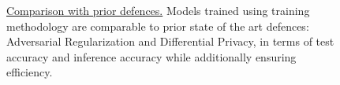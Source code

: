 \begin{figure}[ht!]
\begin{center}
{
}
\caption{\underline{Comparison with prior defences.} Models trained using \method\hspace{0.02in} training methodology are comparable to prior state of the art defences: Adversarial Regularization and Differential Privacy, in terms of test accuracy and inference accuracy while additionally ensuring efficiency.}
\label{fig:loss}
\end{center}
\end{figure}
